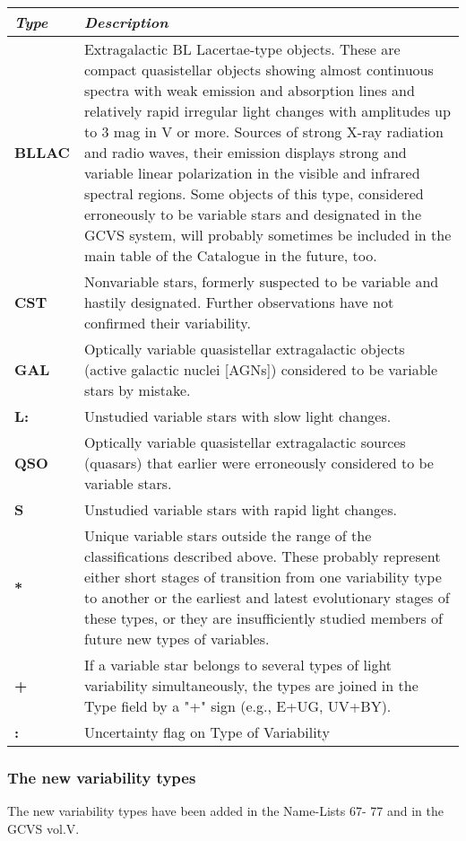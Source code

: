 \begin{longtabu} to \textwidth {l|X}
\toprule
\emph{Type} & \emph{Description}\tabularnewline
\midrule
\textbf{BLLAC} & Extragalactic BL Lacertae-type objects. These are
compact quasistellar objects showing almost continuous spectra with weak
emission and absorption lines and relatively rapid irregular light
changes with amplitudes up to 3 mag in V or more. Sources of strong
X-ray radiation and radio waves, their emission displays strong and
variable linear polarization in the visible and infrared spectral
regions. Some objects of this type, considered erroneously to be
variable stars and designated in the GCVS system, will probably
sometimes be included in the main table of the Catalogue in the future,
too.\tabularnewline
\midrule
\textbf{CST} & Nonvariable stars, formerly suspected to be variable and
hastily designated. Further observations have not confirmed their
variability.\tabularnewline
\midrule
\textbf{GAL} & Optically variable quasistellar extragalactic objects
(active galactic nuclei {[}AGNs{]}) considered to be variable stars by
mistake.\tabularnewline
\midrule
\textbf{L:} & Unstudied variable stars with slow light
changes.\tabularnewline
\midrule
\textbf{QSO} & Optically variable quasistellar extragalactic sources
(quasars) that earlier were erroneously considered to be variable
stars.\tabularnewline
\midrule
\textbf{S} & Unstudied variable stars with rapid light
changes.\tabularnewline
\midrule
\textbf{*} & Unique variable stars outside the range of the
classifications described above. These probably represent either short
stages of transition from one variability type to another or the
earliest and latest evolutionary stages of these types, or they are
insufficiently studied members of future new types of
variables.\tabularnewline
\midrule
\textbf{+} & If a variable star belongs to several types of light
variability simultaneously, the types are joined in the Type field by a
"+" sign (e.g., E+UG, UV+BY).\tabularnewline
\midrule
\textbf{:} & Uncertainty flag on Type of Variability\tabularnewline
\bottomrule
\end{longtabu}

\subsubsection{The new variability types}\label{the-new-variability-types}

The new variability types have been added in the Name-Lists 67- 77 and
in the GCVS vol.V.

